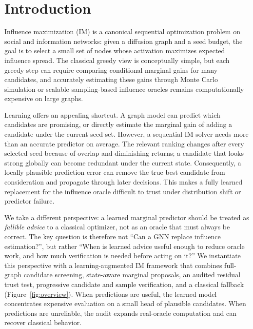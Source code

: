 \section{Introduction}
\label{sec:introduction}

Influence maximization (IM) is a canonical sequential optimization problem on social and information networks: given a diffusion graph and a seed budget, the goal is to select a small set of nodes whose activation maximizes expected influence spread. The classical greedy view is conceptually simple, but each greedy step can require comparing conditional marginal gains for many candidates, and accurately estimating these gains through Monte Carlo simulation or scalable sampling-based influence oracles remains computationally expensive on large graphs.

Learning offers an appealing shortcut. A graph model can predict which candidates are promising, or directly estimate the marginal gain of adding a candidate under the current seed set. However, a sequential IM solver needs more than an accurate predictor on average. The relevant ranking changes after every selected seed because of overlap and diminishing returns; a candidate that looks strong globally can become redundant under the current state. Consequently, a locally plausible prediction error can remove the true best candidate from consideration and propagate through later decisions. This makes a fully learned replacement for the influence oracle difficult to trust under distribution shift or predictor failure.

We take a different perspective: a learned marginal predictor should be treated as \emph{fallible advice} to a classical optimizer, not as an oracle that must always be correct. The key question is therefore not ``Can a GNN replace influence estimation?'', but rather ``When is learned advice useful enough to reduce oracle work, and how much verification is needed before acting on it?'' We instantiate this perspective with a learning-augmented IM framework that combines full-graph candidate screening, state-aware marginal proposals, an audited residual trust test, progressive candidate and sample verification, and a classical fallback (Figure~\ref{fig:overview}). When predictions are useful, the learned model concentrates expensive evaluation on a small head of plausible candidates. When predictions are unreliable, the audit expands real-oracle computation and can recover classical behavior.

